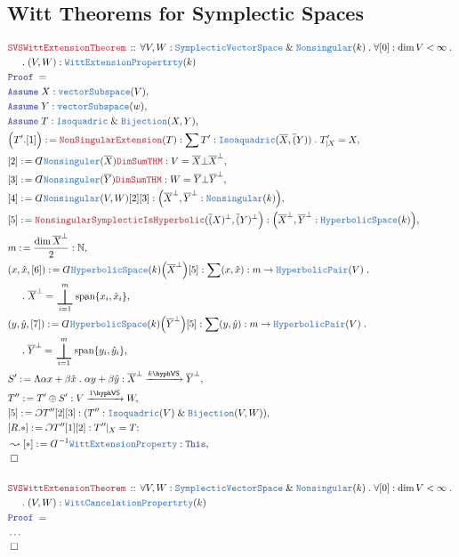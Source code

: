 \documentclass[12pt]{scrartcl}%
\newcommand{\TYPE}[1]{\textcolor{NavyBlue}{\mathtt{#1}}}%
\newcommand{\LOGIC}[1]{\textcolor{Blue}{\mathtt{#1}}}%
\newcommand{\THM}[1]{\textcolor{Maroon}{\mathtt{#1}}}%
\renewcommand{\.}{\; . \;} %
\newcommand{\de}{: \kern 0.1pc =} %
\newcommand{\Theorem}[2]{& \THM{#1} \, :: \, #2 \\ & \Proof = \\ } %
\newcommand{\NewLine}{\\ & \kern 1pc}%
\newcommand{\Page}[1]{ \begin{align*} #1 \end{align*}  }%
\newcommand{ \bd }{ \ByDef }%
\newcommand{\NoProof}{ & \ldots \\ \EndProof}%
\renewcommand{\And}{\; \& \;}%
\newcommand{\Nat}{\mathbb{N}}%
\newcommand{\Say}[3]{& #1 \de #2 : #3, \\} %
\newcommand{\Conclude}[3]{& #1 \de #2 : #3; \\}%
\newcommand{\Derive}[3]{& \leadsto #1 \de #2 : #3, \\} %
\newcommand{\Assume}[2]{& \LOGIC{Assume} \; #1 : #2, \\} %
\newcommand{\QED}{\; \square} %
\newcommand{\EndProof}{& \QED \\} %
\newcommand{\ByDef}{\rotatebox[origin=c]{-180}{$D$}}%
\newcommand{\ByConstr}{\rotatebox[origin=c]{-180}{$C$}}%
\newcommand{\Proof}{\LOGIC{Proof} \; } %
\newcommand{\Arrow}[1]{\xrightarrow{#1}}%
\newcommand{\SVS}{\TYPE{SymplecticVectorSpace}}
\DeclareMathOperator{\Span}{span} %
\DeclareMathOperator{\bigbot}{\scalerel*{\bot}{\sum}} %
\newcommand{\VS}[1]{#1\hyph\mathsf{VS}} %
\begin{document}
\subsection{Witt Theorems for Symplectic Spaces}
\Page{
	\Theorem{SVSWittExtensionTheorem}
	{
		\forall V,W : \SVS \And \TYPE{Nonsingular}(k) \.
		\forall [0] : \dim V < \infty \.\NewLine \. 
		(V,W) : \TYPE{WittExtensionPropertrty}(k) 
	}
	\Assume{X}{\TYPE{vectorSubspace}(V)}
	\Assume{Y}{\TYPE{vectorSubspace}(w)}
	\Assume{T}{\TYPE{Isoquadric} \And \TYPE{Bijection}(X,Y)}
	\Say{\Big(T'.[1]\Big)}{\THM{NonSingularExtension}(T)}{ \sum T' : \TYPE{Isoaquadric}(\overline{X},\overline(Y)) \. T'_{|X} = X  }
	\Say{[2]}{\bd \TYPE{Nonsinguler}(\overline{X})\THM{DimSumTHM}}{ V = \overline{X} \bot \overline{X}^\bot }
	\Say{[3]}{\bd \TYPE{Nonsinguler}(\overline{Y})\THM{DimSumTHM}}{ W = \overline{Y} \bot \overline{Y}^\bot }
	\Say{[4]}{\bd \TYPE{Nonsingular} (V,W)[2][3]}{ \Big(\overline{X}^\bot,\overline{Y}^\bot : \TYPE{Nonsingular}(k)\Big)}
	\Say{[5]}{\THM{NonsingularSymplecticIsHyperbolic}(\overline(X)^\bot,\overline(Y)^\bot\Big)}{\Big(\overline{X}^\bot,\overline{Y}^\bot : \TYPE{HyperbolicSpace}(k)\Big)}	
	\Say{m}{\frac{\dim \overline{X}^\bot}{2}}{\Nat}
	\Say{(x,\hat x,[6])}{\bd \TYPE{HyperbolicSpace}(k)\Big(\overline{X}^\bot\Big)[5] }{ \sum (x, \hat x) : m \to \TYPE{HyperbolicPair}(V) \. \NewLine \. \overline{X}^\bot = \bigbot^m_{i=1} \Span\{ x_i,\hat x_i\} }
	\Say{(y,\hat y,[7])}{\bd \TYPE{HyperbolicSpace}(k)\Big(\overline{Y}^\bot\Big)[5] }{ \sum (y, \hat y) : m \to \TYPE{HyperbolicPair}(V) \. \NewLine \. \overline{Y}^\bot = \bigbot^m_{i=1} \Span\{ y_i,\hat y_i\} }
	\Say{S'}{\Lambda \alpha x + \beta \hat x \. \alpha y + \beta \hat y}{ \overline{X}^\bot \Arrow{\VS{k}} \overline{Y}^\bot }
	\Say{T''}{T' \oplus S'}{V \Arrow{\VS{1}} W}
	\Say{[5]}{\ByConstr T''[2][3]}{(T'' : \TYPE{Isoquadric}(V) \And \TYPE{Bijection}(V,W))}
	\Conclude{[R.*]}{\ByConstr T'' [1][2]}{T''|_{X} = T}
	\Derive{[*]}{\bd^{-1}\TYPE{WittExtensionProperty}}{\LOGIC{This}}
	\EndProof
	\\
	\Theorem{SVSWittExtensionTheorem}
	{
		\forall V,W : \SVS \And \TYPE{Nonsingular}(k) \.
		\forall [0] : \dim V < \infty \.\NewLine \. 
		(V,W) : \TYPE{WittCancelationPropertrty}(k) 
	}
	\NoProof
}
\newpage
\end{document}
